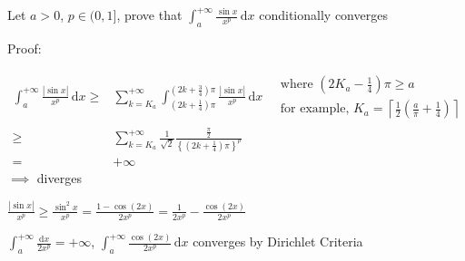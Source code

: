 \begin{example}
    Let $a>0$, $p\in(0,1]$, prove that $\int_a^{+\infty}\frac{\sin x}{x^p}\,\mathrm{d}x$ conditionally converges

    Proof:

    \begin{align*}
        \int_a^{+\infty}\frac{\left|\sin x\right|}{x^p}\,\mathrm{d}x\geq & \sum_{k=K_a}^{+\infty}\int_{\left(2k+\frac{1}{4}\right)\pi}^{\left(2k+\frac{3}{4}\right)\pi}\frac{\left|\sin x\right|}{x^p}\,\mathrm{d}x\quad\begin{matrix}
                                                                                                                                                                                                                            \text{where }\left(2K_a-\frac{1}{4}\right)\pi\geq a \\
                                                                                                                                                                                                                            \text{for example, }K_a=\left\lceil\frac{1}{2}\left(\frac{a}{\pi}+\frac{1}{4}\right)\right\rceil
                                                                                                                                                                                                                        \end{matrix} \\
        \geq                                                             & \sum_{k=K_a}^{+\infty}\frac{1}{\sqrt{2}}\frac{\frac{\pi}{2}}{\left\{\left(2k+\frac{1}{4}\right)\pi\right\}^p}                                                                                                                                \\
        =                                                                & +\infty
    \end{align*}
    $\implies$ diverges

    $\frac{\left|\sin x\right|}{x^p}\geq\frac{\sin^2x}{x^p}=\frac{1-\cos(2x)}{2x^p}=\frac{1}{2x^p}-\frac{\cos(2x)}{2x^p}$

    $\int_a^{+\infty}\frac{\mathrm{d}x}{2x^p}=+\infty$, $\int_a^{+\infty}\frac{\cos(2x)}{2x^p}\,\mathrm{d}x$ converges by Dirichlet Criteria
\end{example}